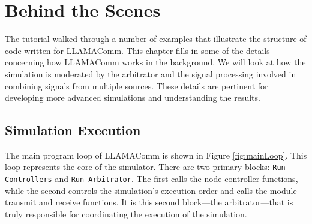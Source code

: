 %  
% 
% 
% 
% 

\chapter{Behind the Scenes}

The tutorial walked through a number of examples that illustrate the
structure of code written for LLAMAComm.  This chapter fills in some
of the details concerning how LLAMAComm works in the background.  We
will look at how the simulation is moderated by the arbitrator and
the signal processing involved in combining signals from multiple
sources.  These details are pertinent for developing more advanced
simulations and understanding the results.

\section{Simulation Execution}\label{sec:simExecution}

The main program loop of LLAMAComm is shown in Figure
\ref{fig:mainLoop}. This loop represents the core of the simulator.
There are two primary blocks: \verb+Run Controllers+ and
\verb+Run Arbitrator+. The first calls the node controller functions, while
the second controls the simulation's execution order and calls the
module transmit and receive functions.  It is this second
block---the arbitrator---that is truly responsible for coordinating
the execution of the simulation.

